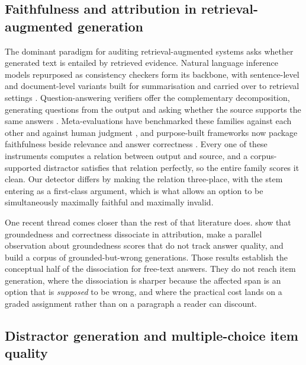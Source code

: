 \documentclass[11pt]{article}
\begin{document}
\subsection{Faithfulness and attribution in retrieval-augmented generation}

The dominant paradigm for auditing retrieval-augmented systems asks whether generated text is entailed by retrieved evidence. Natural language inference models repurposed as consistency checkers form its backbone, with sentence-level and document-level variants built for summarisation and carried over to retrieval settings \citep{kryscinski2020evaluating,laban2022summac,zha2023alignscore}. Question-answering verifiers offer the complementary decomposition, generating questions from the output and asking whether the source supports the same answers \citep{wang2020asking,durmus2020feqa,honovich2021evaluating,fabbri2022qafacteval}. Meta-evaluations have benchmarked these families against each other and against human judgment \citep{honovich2022true,tang2023understanding}, and purpose-built frameworks now package faithfulness beside relevance and answer correctness \citep{es2024ragas,saadfalcon2024ares,yu2025evaluation}. Every one of these instruments computes a relation between output and source, and a corpus-supported distractor satisfies that relation perfectly, so the entire family scores it clean. Our detector differs by making the relation three-place, with the stem entering as a first-class argument, which is what allows an option to be simultaneously maximally faithful and maximally invalid.

One recent thread comes closer than the rest of that literature does. \citet{wallat2025correctness} show that groundedness and correctness dissociate in attribution, \citet{stolfo2024groundedness} make a parallel observation about groundedness scores that do not track answer quality, and \citet{niu2024ragtruth} build a corpus of grounded-but-wrong generations. Those results establish the conceptual half of the dissociation for free-text answers. They do not reach item generation, where the dissociation is sharper because the affected span is an option that is \emph{supposed} to be wrong, and where the practical cost lands on a graded assignment rather than on a paragraph a reader can discount.

\subsection{Distractor generation and multiple-choice item quality}
\end{document}
